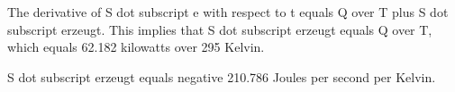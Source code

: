 The derivative of S dot subscript e with respect to t equals Q over T plus S dot subscript erzeugt. This implies that S dot subscript erzeugt equals Q over T, which equals 62.182 kilowatts over 295 Kelvin.

S dot subscript erzeugt equals negative 210.786 Joules per second per Kelvin.